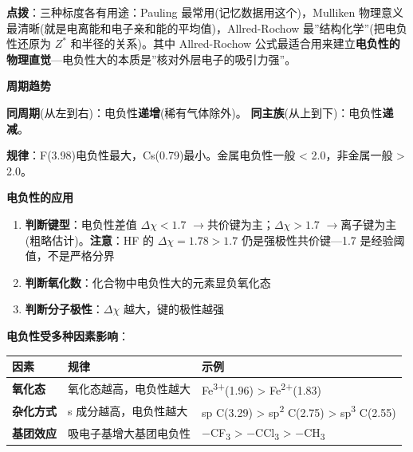 \documentclass[a4paper,11pt]{ctexart}
\providecommand{\tightlist}{\setlength{\itemsep}{0pt}\setlength{\parskip}{0pt}}
\newcounter{none}
\newcommand{\箭}{\ensuremath{\rightarrow}}
\newcommand{\左箭}{\ensuremath{\leftarrow}}
\newcommand{\上箭}{\ensuremath{\uparrow}}
\newcommand{\下箭}{\ensuremath{\downarrow}}
\newcommand{\衡}{\ensuremath{\rightleftharpoons}}
\newcommand{\双箭}{\ensuremath{\leftrightarrow}}
\newcommand{\约等于}{\ensuremath{\approx}}
\newcommand{\小于等于}{\ensuremath{\leq}}
\newcommand{\大于等于}{\ensuremath{\geq}}
\newcommand{\不等于}{\ensuremath{\neq}}
\newcommand{\西格马}{\ensuremath{\sigma}}
\newcommand{\派}{\ensuremath{\pi}}
\begin{document}
\textbf{点拨}：三种标度各有用途：Pauling 最常用(记忆数据用这个)，Mulliken 物理意义最清晰(就是电离能和电子亲和能的平均值)，Allred-Rochow 最''结构化学''(把电负性还原为 \(Z^*\) 和半径的关系)。其中 Allred-Rochow 公式最适合用来建立\textbf{电负性的物理直觉}---电负性大的本质是''核对外层电子的吸引力强''。

\textbf{周期趋势}

\textbf{同周期}(从左到右)：电负性\textbf{递增}(稀有气体除外)。
\textbf{同主族}(从上到下)：电负性\textbf{递减}。

\textbf{规律}：F(3.98)电负性最大，Cs(0.79)最小。金属电负性一般 \textless{} 2.0，非金属一般 \textgreater{} 2.0。

\textbf{电负性的应用}

\begin{enumerate}
\def\labelenumi{\arabic{enumi}.}
\tightlist
\item
  \textbf{判断键型}：电负性差值 \(\Delta\chi < 1.7\) \箭 共价键为主；\(\Delta\chi > 1.7\) \箭 离子键为主(粗略估计)。\textbf{注意}：HF 的 \(\Delta\chi = 1.78 > 1.7\) 仍是强极性共价键---1.7 是经验阈值，不是严格分界
\item
  \textbf{判断氧化数}：化合物中电负性大的元素显负氧化态
\item
  \textbf{判断分子极性}：\(\Delta\chi\) 越大，键的极性越强
\end{enumerate}

\textbf{电负性受多种因素影响}：

{\def\LTcaptype{none} %
\begin{longtable}[]{@{}
  >{\raggedright\arraybackslash}p{}
  >{\raggedright\arraybackslash}p{}
  >{\raggedright\arraybackslash}p{}@{}}
\toprule\noalign{}
\begin{minipage}[b]{\linewidth}\raggedright
因素
\end{minipage} & \begin{minipage}[b]{\linewidth}\raggedright
规律
\end{minipage} & \begin{minipage}[b]{\linewidth}\raggedright
示例
\end{minipage} \\
\midrule\noalign{}
\endhead
\bottomrule\noalign{}
\endlastfoot
\textbf{氧化态} & 氧化态越高，电负性越大 & Fe\textsuperscript{3+}(1.96) \textgreater{} Fe\textsuperscript{2+}(1.83) \\
\textbf{杂化方式} & s 成分越高，电负性越大 & sp C(3.29) \textgreater{} sp\textsuperscript{2} C(2.75) \textgreater{} sp\textsuperscript{3} C(2.55) \\
\textbf{基团效应} & 吸电子基增大基团电负性 & −CF\textsubscript{3} \textgreater{} −CCl\textsubscript{3} \textgreater{} −CH\textsubscript{3} \\
\end{longtable}
}
\end{document}

